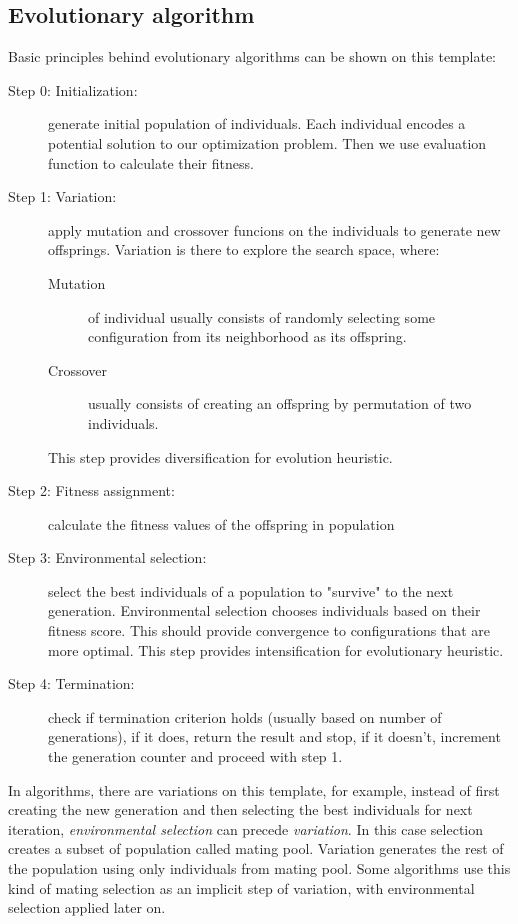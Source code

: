 \documentclass[12pt,oneside]{fithesis2}
\begin{document}
\subsection{Evolutionary algorithm}
Basic principles behind evolutionary algorithms can be shown on this template\cite{talbi2009metaheuristics}: 
\begin{description}
	\item[Step 0: Initialization:] generate initial population of individuals. Each individual encodes a potential solution to our optimization problem. Then we use evaluation function to calculate their fitness. 

    \item[Step 1: Variation:] apply mutation and crossover funcions on the individuals to generate new offsprings. Variation is there to explore the search space, where: 
        \begin{description}
            \item[Mutation] of individual usually consists of randomly selecting some configuration from its neighborhood as its offspring.
            \item[Crossover] usually consists of creating an offspring by permutation of two individuals. 
        \end{description}
        This step provides diversification for evolution heuristic.
	\item[Step 2: Fitness assignment:] calculate the fitness values of the offspring in population
	\item[Step 3: Environmental selection:] select the best individuals of a population to "survive" to the next generation. Environmental selection chooses individuals based on their fitness score. This should provide convergence to configurations that are more optimal. This step provides intensification for evolutionary heuristic.
	\item[Step 4: Termination:] check if termination criterion holds (usually based on number of generations), if it does, return the result and stop, if it doesn't, increment the generation counter and proceed with step 1.
\end{description}

In algorithms, there are variations on this template, for example, instead of first creating the new generation and then selecting the best individuals for next iteration, \emph{environmental selection} can precede \emph{variation}. In this case selection creates a subset of population called mating pool. Variation generates the rest of the population using only individuals from mating pool. Some algorithms use this kind of mating selection as an implicit step of variation, with environmental selection applied later on. 
\end{document}
